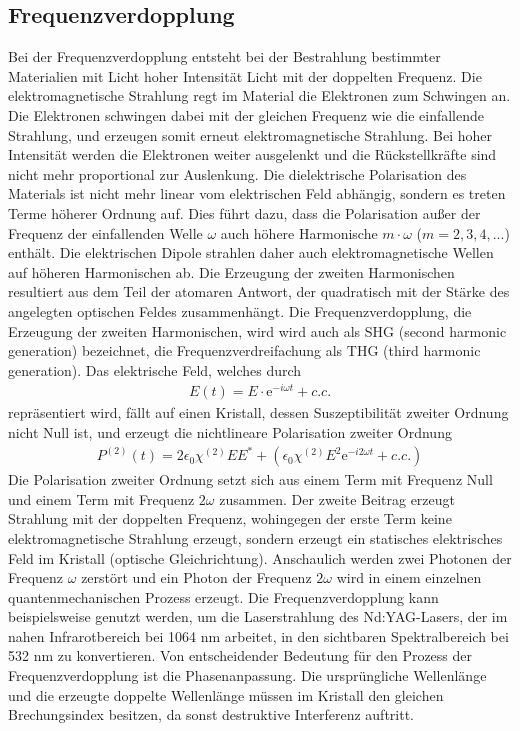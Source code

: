 \documentclass[twoside,colorback,accentcolor=tud4c,11pt]{tudreport}
\begin{document}
\subsection{Frequenzverdopplung}\label{freq}
Bei der Frequenzverdopplung entsteht bei der Bestrahlung bestimmter Materialien mit Licht hoher Intensität Licht mit der doppelten Frequenz. Die elektromagnetische Strahlung regt im Material die Elektronen zum Schwingen an. Die Elektronen schwingen dabei mit der gleichen Frequenz wie die einfallende Strahlung, und erzeugen somit erneut elektromagnetische Strahlung. Bei hoher Intensität werden die Elektronen weiter ausgelenkt und die Rückstellkräfte sind nicht mehr proportional zur Auslenkung. Die dielektrische Polarisation des Materials ist nicht mehr linear vom elektrischen Feld abhängig, sondern es treten Terme höherer Ordnung auf. Dies führt dazu, dass die Polarisation außer der Frequenz der einfallenden Welle $\omega$ auch höhere Harmonische $m\cdot \omega$ ($m=2,3,4,...$) enthält. Die elektrischen Dipole strahlen daher auch elektromagnetische Wellen auf höheren Harmonischen ab. Die Erzeugung der zweiten Harmonischen resultiert aus dem Teil der atomaren Antwort, der quadratisch mit der Stärke des angelegten optischen Feldes zusammenhängt. Die Frequenzverdopplung, die Erzeugung der zweiten Harmonischen, wird wird auch als SHG (second harmonic generation) bezeichnet, die Frequenzverdreifachung als THG (third harmonic generation). 
Das elektrische Feld, welches durch
\begin{align*}
E(t)=E\cdot\text{e}^{-i\omega t} + c.c.
\end{align*}
repräsentiert wird, fällt auf einen Kristall, dessen Suszeptibilität zweiter Ordnung nicht Null ist, und erzeugt die nichtlineare Polarisation zweiter Ordnung
\begin{align*}
P^{(2)}(t)=2\epsilon_0\chi^{(2)}EE^*+\left(\epsilon_0\chi^{(2)}E^2\text{e}^{-i2\omega t}+c.c.\right)
\end{align*} 
Die Polarisation zweiter Ordnung setzt sich aus einem Term mit Frequenz Null und einem Term mit Frequenz $2\omega$ zusammen. Der zweite Beitrag erzeugt Strahlung mit der doppelten Frequenz, wohingegen der erste Term keine elektromagnetische Strahlung erzeugt, sondern erzeugt ein statisches elektrisches Feld im Kristall (optische Gleichrichtung).
Anschaulich werden zwei Photonen der Frequenz $\omega$ zerstört und ein Photon der Frequenz $2\omega$ wird in einem einzelnen quantenmechanischen Prozess erzeugt. Die Frequenzverdopplung kann beispielsweise genutzt werden, um die Laserstrahlung des Nd:YAG-Lasers, der im nahen Infrarotbereich bei 1064 nm arbeitet, in den sichtbaren Spektralbereich bei 532 nm zu konvertieren. Von entscheidender Bedeutung für den Prozess der Frequenzverdopplung ist die Phasenanpassung. Die ursprüngliche Wellenlänge und die erzeugte doppelte Wellenlänge müssen im Kristall den gleichen Brechungsindex besitzen, da sonst destruktive Interferenz auftritt.
\cite{2,6,7}	
\end{document}
